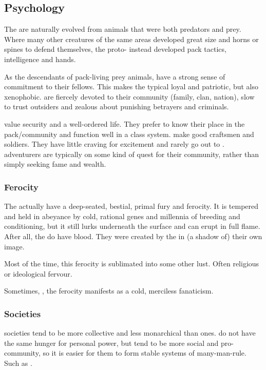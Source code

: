 \subsection{Psychology}
The \scathae{} are naturally evolved from animals that were both predators and prey. Where many other creatures of the same areas developed great size and horns or spines to defend themselves, the proto-\scathae{} instead developed pack tactics, intelligence and hands. 

As the descendants of pack-living prey animals, \scathae{} have a strong sense of commitment to their fellows. This makes the typical \scatha{} loyal and patriotic, but also xenophobic. \Scathae{} are fiercely devoted to their community (family, clan, nation), slow to trust outsiders and zealous about punishing betrayers and criminals. 

\Scathae{} value security and a well-ordered life. They prefer to know their place in the pack/community and function well in a class system. \Scathae{} make good craftsmen and soldiers. They have little craving for excitement and rarely go out to . \Scathaese{} adventurers are typically on some kind of quest for their community, rather than simply seeking fame and wealth. 





\subsubsection{Ferocity}
The \scathae{} actually have a deep-seated, bestial, primal fury and ferocity. 
It is tempered and held in abeyance by cold, rational \ophidian{} genes and millennia of breeding and conditioning, but it still lurks underneath the surface and can erupt in full flame. 
After all, the \scathae{} do have \xsic{} blood. 
They were created by the \dzraicchenosses{} in (a shadow of) their own image. 

Most of the time, this ferocity is sublimated into some other lust. 
Often religious or ideological fervour. 

Sometimes, , the ferocity manifests as a cold, merciless fanaticism. 





\subsubsection{Societies}
\Scathaese{} societies tend to be more collective and less monarchical than \human{} ones. 
\Scathae{} do not have the same hunger for personal power, but tend to be more social and pro-community, so it is easier for them to form stable systems of many-man-rule. 
Such as . 





